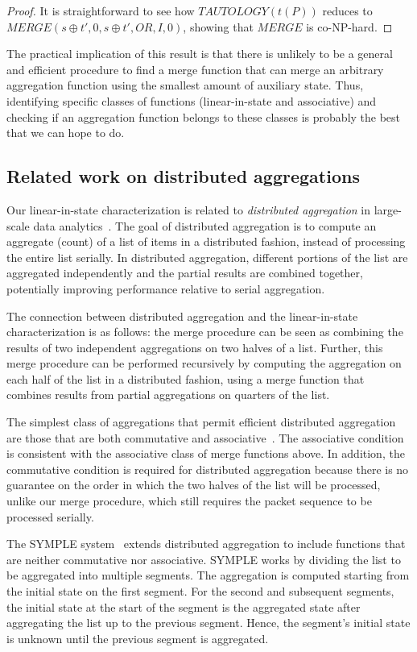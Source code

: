 \begin{proof}
It is straightforward to see how $TAUTOLOGY(t(P))$ reduces to $MERGE(s \oplus
t', 0, s \oplus t', OR, I, 0)$, showing that $MERGE$ is co-NP-hard.
\end{proof}

The practical implication of this result is that there is unlikely to be a
general and efficient procedure to find a merge function that can merge an
arbitrary aggregation function using the smallest amount of auxiliary state.
Thus, identifying specific classes of functions (\eg linear-in-state and
associative) and checking if an aggregation function belongs to these classes
is probably the best that we can hope to do.

\subsection{Related work on distributed aggregations} Our linear-in-state
characterization is related to {\em distributed aggregation} in large-scale
data analytics~\cite{symple, distagg}. The goal of distributed aggregation is
to compute an aggregate (\eg count) of a list of items in a distributed
fashion, instead of processing the entire list serially. In distributed
aggregation, different portions of the list are aggregated independently and
the partial results are combined together, potentially improving performance
relative to serial aggregation.

The connection between distributed aggregation and the linear-in-state
characterization is as follows: the merge procedure can be seen as combining
the results of two independent aggregations on two halves of a list.  Further,
this merge procedure can be performed recursively by computing the aggregation
on each half of the list in a distributed fashion, \ie using a merge function
that combines results from partial aggregations on quarters of the list.

The simplest class of aggregations that permit efficient distributed
aggregation are those that are both commutative and associative~\cite{distagg}.
The associative condition is consistent with the associative class of merge
functions above. In addition, the commutative condition is required for
distributed aggregation because there is no guarantee on the order in which the
two halves of the list will be processed, unlike our merge procedure, which
still requires the packet sequence to be processed serially.

The SYMPLE system~\cite{symple} extends distributed aggregation to include
functions that are neither commutative nor associative.  SYMPLE works by
dividing the list to be aggregated into multiple segments. The aggregation is
computed starting from the initial state on the first segment.  For the second
and subsequent segments, the initial state at the start of the segment is the
aggregated state after aggregating the list up to the previous segment. Hence,
the segment's initial state is unknown until the previous segment is
aggregated.

